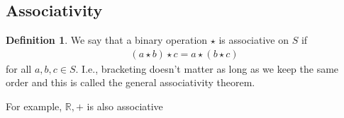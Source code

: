 \documentclass[a4paper]{article}
\theoremstyle{plain}
\theoremstyle{definition}
\newtheorem{defn}{Definition}[section]
\newtheorem{exmp}{Example}[section]
\theoremstyle{remark}
\begin{document}
\subsection{Associativity}
\begin{defn}
We say that a binary operation $\star$ is associative on $S$ if
\begin{align*}
	(a \star b) \star c = a \star (b \star c)
\end{align*}
for all $a,b,c \in S$. I.e., bracketing doesn't matter as long as we keep the same order and this is called the general associativity theorem.
\begin{tcolorbox}[colback=black!3!white,colframe=black!60!white,title=\begin{exmp}Examples of associativity \label{Examples of associativity}\end{exmp}]
        For example, $\mathbb{R}, +$ is also associative
\end{tcolorbox}
\end{defn}
\end{document}
